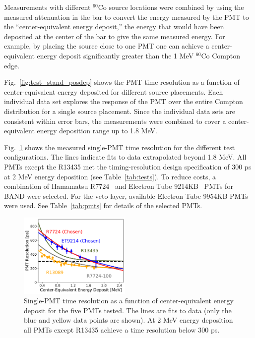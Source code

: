 \documentclass[review,number,sort&compress]{elsarticle}
\begin{document}
Measurements with different $^{60}$Co
source locations were combined by using the measured attenuation in the bar to convert
the energy measured by the PMT to the ``center-equivalent energy
deposit,'' the energy that would have been deposited at the center of
the bar to give the same measured energy.  For example, by placing the
source close to one PMT one can achieve a center-equivalent energy
deposit significantly greater than the 1 \si{\mega\electronvolt} $^{60}$Co Compton edge.

Fig.~\ref{fig:test_stand_posdep} shows the PMT time resolution as a
function of center-equivalent energy deposited for different source placements. Each individual data set explores the response of the PMT over the entire Compton distribution for a single source placement. Since the individual data sets are consistent within error bars,
the measurements were combined to cover a center-equivalent energy deposition range
up to 1.8 \si{\mega\electronvolt}.



Fig.~\ref{fig:test_stand_results} shows the measured single-PMT time
resolution for the different test configurations.  The lines indicate fits
to data extrapolated beyond 1.8 \si{\mega\electronvolt}.  
All PMTs except the R13435 met the timing-resolution design specification of 300 \si{\pico\s} at 2
\si{\mega\electronvolt} energy deposition (see 
Table~\ref{tab:tests}).  To reduce costs, a combination of
Hamamatsu R7724~\cite{pmtR7724} and Electron Tube 9214KB~\cite{pmt9214} PMTs for BAND were selected. For the veto layer,  
available Electron Tube 9954KB PMTs were used. See Table~\ref{tab:pmts} for
details of the selected PMTs.

\begin{figure}[tb]
	\centering
		\includegraphics[width=0.48\textwidth]{fig6-pmt-res.pdf}
		\caption{Single-PMT time resolution as a function of center-equivalent energy deposit for the five PMTs
                  tested. The lines are fits to data (only the blue  and yellow data points are shown). At 2
                  \si{\mega\electronvolt} energy deposition all PMTs except R13435 achieve a time resolution below 300 \si{\pico\s}.}
          	\label{fig:test_stand_results}
\end{figure}
\end{document}
